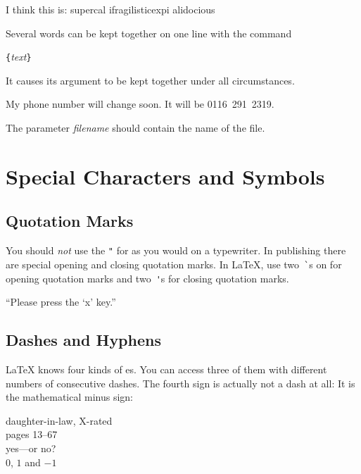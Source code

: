 \begin{example}
I think this is: su\-per\-cal\-%
i\-frag\-i\-lis\-tic\-ex\-pi\-%
al\-i\-do\-cious
\end{example}

Several words can be kept together on one line with the command
\begin{command}
\verb|{|\emph{text}\verb|}|
\end{command}
\noindent It causes its argument to be kept together under all circumstances.

\begin{example}
My phone number will change soon.
It will be \mbox{0116 291 2319}.

The parameter 
\mbox{\emph{filename}} should 
contain the name of the file.
\end{example}
 
\section{Special Characters and Symbols}
%
%
 
\subsection{Quotation Marks}

You should \emph{not} use the \verb|"| for  
 as you would on a typewriter.  In publishing there are
special opening and closing quotation marks.  In \LaTeX{}, use
two~\verb|`|s on for opening quotation marks and two~\verb|'|s for closing
quotation marks.

\begin{example}
``Please press the `x' key.''
\end{example}
 
\subsection{Dashes and Hyphens}

\LaTeX{} knows four kinds of es. You can access three of
them with different numbers of consecutive dashes. The fourth sign
is actually not a dash at all: It is the mathematical minus sign: \index{-}
\index{--} \index{---}  

\begin{example}
daughter-in-law, X-rated\\
pages 13--67\\
yes---or no? \\
$0$, $1$ and $-1$
\end{example}

